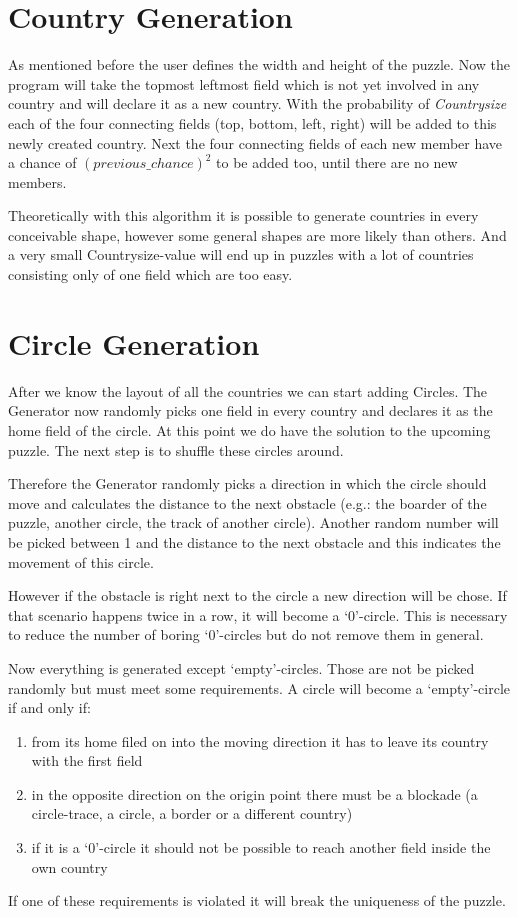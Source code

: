 \section{Country Generation}
As mentioned before the user defines the width and height of the puzzle. Now the program will take the topmost leftmost field which is not yet involved in any country and will declare it as a new country. With the probability of \emph{Countrysize} each of the four connecting fields (top, bottom, left, right) will be added to this newly created country. Next the four connecting fields of each new member have a chance of \emph{\((previous\_chance)^2\)} to be added too, until there are no new members.

Theoretically with this algorithm it is possible to generate countries in every conceivable shape, however some general shapes are more likely than others. And a very small Countrysize-value will end up in puzzles with a lot of countries consisting only of one field which are too easy.

\section{Circle Generation}
After we know the layout of all the countries we can start adding Circles. The Generator now randomly picks one field in every country and declares it as the home field of the circle. At this point we do have the solution to the upcoming puzzle. The next step is to shuffle these circles around.

Therefore the Generator randomly picks a direction in which the circle should move and calculates the distance to the next obstacle (e.g.: the boarder of the puzzle, another circle, the track of another circle). Another random number will be picked between 1 and the distance to the next obstacle and this indicates the movement of this circle. 

However if the obstacle is right next to the circle a new direction will be chose. If that scenario happens twice in a row, it will become a `0'-circle. This is necessary to reduce the number of boring `0'-circles but do not remove them in general.

Now everything is generated except `empty'-circles. Those are not be picked randomly but must meet some requirements. A circle will become a `empty'-circle if and only if:
\begin{enumerate}
  \item from its home filed on into the moving direction it has to leave its country with the first field
  \item in the opposite direction on the origin point there must be a blockade (a circle-trace, a circle, a border or a different country)
  \item if it is a `0'-circle it should not be possible to reach another field inside the own country
\end{enumerate}
If one of these requirements is violated it will break the uniqueness of the puzzle.

